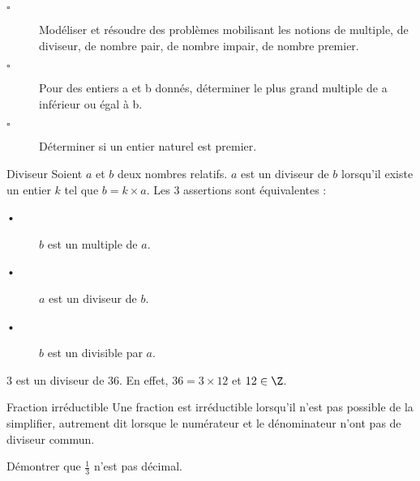 \begin{titre}[Arithmétique]

\end{titre}

\begin{CpsCol}
\begin{description}
\item[$\square$] Modéliser et résoudre des problèmes mobilisant les notions de multiple, de diviseur,
de nombre pair, de nombre impair, de nombre premier.
\item[$\square$] Pour des entiers a et b donnés, déterminer le plus grand multiple de a inférieur ou
égal à b.
\item[$\square$] Déterminer si un entier naturel est premier.
\end{description}
\end{CpsCol}

\begin{DefT}{Diviseur}
Soient $a$ et $b$ deux nombres relatifs. $a$ est un diviseur de $b$ lorsqu'il existe un entier $k$ tel que $b = k  \times a$. Les 3 assertions sont équivalentes :
\begin{description}
\item[•] $b$ est un multiple de $a$.
\item[•] $a$ est un diviseur de $b$.
\item[•] $b$ est un divisible par $a$.
\end{description}
\end{DefT}

\begin{Ex}
3 est un diviseur de 36. En effet, $36 = 3 \times 12$ et $12 \in \Z$.
\end{Ex}


\begin{DefT}{Fraction irréductible}
Une fraction est irréductible lorsqu'il n'est pas possible de la simplifier, autrement dit lorsque le numérateur et le dénominateur n'ont pas de diviseur commun.
\end{DefT}

\begin{ROC}

Démontrer que $\frac{1}{3}$ n'est pas décimal.
\end{ROC}





